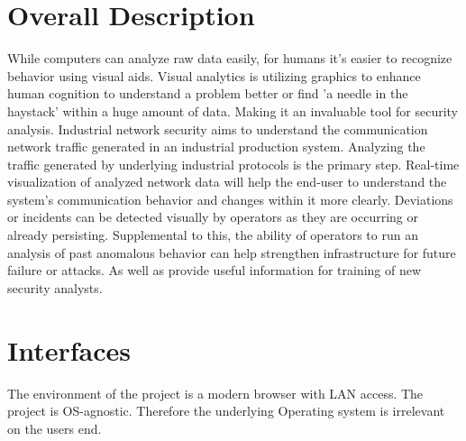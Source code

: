 \documentclass[twoside, english, draft]{Pflichtenheft}
\begin{document}
\section{Overall Description}

While computers can analyze raw data easily, for humans it's easier to recognize behavior using visual aids.
Visual analytics is utilizing graphics to enhance human cognition to understand a problem better or find 'a needle in the haystack' within a huge amount of data. Making it an invaluable tool for security analysis.
\newline
\newline
Industrial network security aims to understand the communication network traffic generated in an industrial production system. Analyzing the traffic generated by underlying industrial protocols is the primary step.
\newline
\newline
Real-time visualization of analyzed network data will help the end-user to understand the system's communication behavior and changes within it more clearly. Deviations or incidents can be detected visually by operators as they are occurring or already persisting.\newline
\newline
Supplemental to this, the ability of operators to run an analysis of past anomalous behavior can help strengthen infrastructure for future failure or attacks. As well as provide useful information for training of new security analysts.
\newpage
\section{Interfaces}


	The environment of the project is a modern browser with LAN access. The project is OS-agnostic. Therefore the underlying Operating system is irrelevant on the users end.
\end{document}

